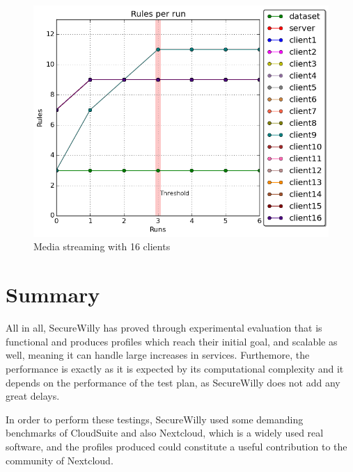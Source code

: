 \begin{figure}[h!]
  \centering
   \includegraphics[width=0.68\linewidth]{./figures/scalability/rules_16_t.png}
   \caption{Media streaming with 16 clients}
\end{figure}

\section{Summary}
All in all, SecureWilly has proved through experimental evaluation that is functional and produces profiles which reach their initial goal, and scalable as well, meaning it can handle large increases in services. Furthemore, the performance is exactly as it is expected by its computational complexity and it depends on the performance of the test plan, as SecureWilly does not add any great delays.

In order to perform these testings, SecureWilly used some demanding benchmarks of CloudSuite and also Nextcloud, which is a widely used real software, and the profiles produced could constitute a useful contribution to the community of Nextcloud.
